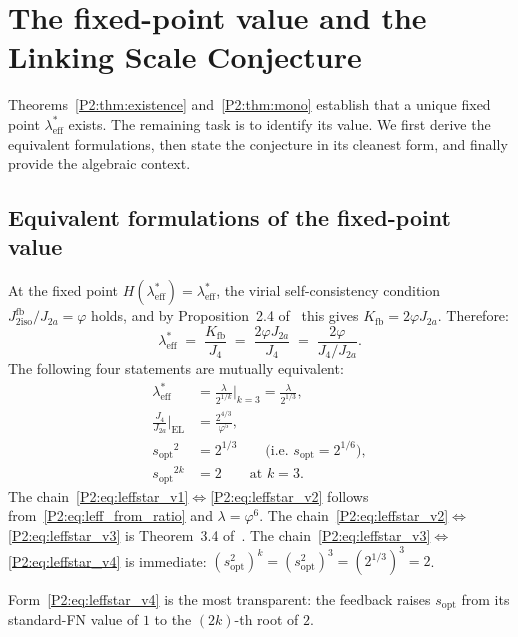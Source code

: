 \documentclass[11pt,a4paper]{article}
\newcommand{\vp}{\varphi}
\newcommand{\lam}{\lambda}
\newcommand{\leff}{\lambda_{\mathrm{eff}}}
\newcommand{\Kfb}{K_{\mathrm{fb}}}
\newcommand{\Jfb}{J_{2\mathrm{iso}}^{\mathrm{fb}}}
\newcommand{\Ja}{J_{2a}}
\newcommand{\Jfour}{J_{4}}
\newcommand{\sopt}{s_{\mathrm{opt}}}
\theoremstyle{remark}
\begin{document}
\section{The fixed-point value and the Linking Scale Conjecture}
\label{P2:sec:lsl}

Theorems~\ref{P2:thm:existence} and~\ref{P2:thm:mono} establish that a
unique fixed point $\leff^*$ exists.  The remaining task is to
identify its value.  We first derive the equivalent formulations,
then state the conjecture in its cleanest form, and finally provide
the algebraic context.

\subsection{Equivalent formulations of the fixed-point value}
\label{P2:sec:equiv}

At the fixed point $H(\leff^*)=\leff^*$, the virial
self-consistency condition $\Jfb/\Ja=\vp$ holds, and by
Proposition~2.4 of~\cite{Paper1} this gives $\Kfb = 2\vp\Ja$.
Therefore:
\begin{equation}
  \leff^* \;=\; \frac{\Kfb}{\Jfour} \;=\; \frac{2\vp\Ja}{\Jfour}
  \;=\; \frac{2\vp}{\Jfour/\Ja}.
  \label{P2:eq:leff_from_ratio}
\end{equation}
The following four statements are mutually equivalent:
\begin{align}
  \leff^* &= \frac{\lam}{2^{1/k}}\bigg|_{k=3} = \frac{\lam}{2^{1/3}},
  \label{P2:eq:leffstar_v1}\\
  \frac{\Jfour}{\Ja}\bigg|_{\mathrm{EL}} &= \frac{2^{4/3}}{\vp^5},
  \label{P2:eq:leffstar_v2}\\
  {\sopt}^2 &= 2^{1/3} \qquad\text{(i.e.\ }\sopt = 2^{1/6}\text{)},
  \label{P2:eq:leffstar_v3}\\
  {\sopt}^{2k} &= 2 \qquad\text{at }k=3.
  \label{P2:eq:leffstar_v4}
\end{align}
The chain~\eqref{P2:eq:leffstar_v1}$\Leftrightarrow$\eqref{P2:eq:leffstar_v2}
follows from~\eqref{P2:eq:leff_from_ratio} and $\lam=\vp^6$.
The chain~\eqref{P2:eq:leffstar_v2}$\Leftrightarrow$\eqref{P2:eq:leffstar_v3}
is Theorem~3.4 of~\cite{Paper1}.
The chain~\eqref{P2:eq:leffstar_v3}$\Leftrightarrow$\eqref{P2:eq:leffstar_v4}
is immediate: $(\sopt^2)^k = (\sopt^2)^3 = (2^{1/3})^3 = 2$.

Form~\eqref{P2:eq:leffstar_v4} is the most transparent: the feedback
raises $\sopt$ from its standard-FN value of $1$ to the $(2k)$-th
root of $2$.
\end{document}
